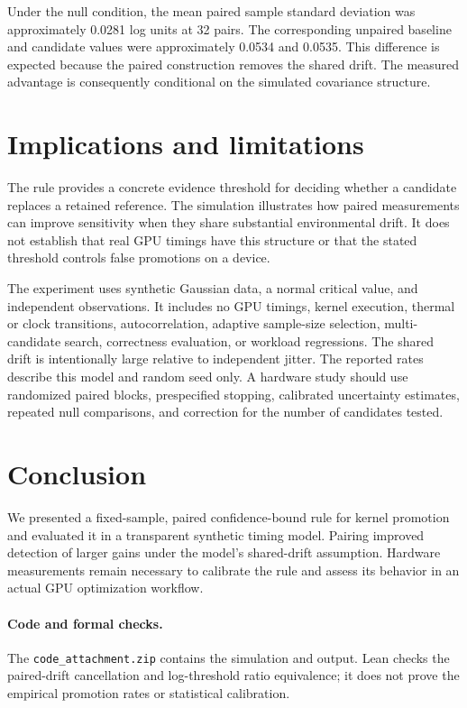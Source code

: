 \documentclass[11pt]{article}
\begin{document}
Under the null condition, the mean paired sample standard deviation was approximately 0.0281 log units at 32 pairs. The corresponding unpaired baseline and candidate values were approximately 0.0534 and 0.0535. This difference is expected because the paired construction removes the shared drift. The measured advantage is consequently conditional on the simulated covariance structure.

\section{Implications and limitations}
The rule provides a concrete evidence threshold for deciding whether a candidate replaces a retained reference. The simulation illustrates how paired measurements can improve sensitivity when they share substantial environmental drift. It does not establish that real GPU timings have this structure or that the stated threshold controls false promotions on a device.

The experiment uses synthetic Gaussian data, a normal critical value, and independent observations. It includes no GPU timings, kernel execution, thermal or clock transitions, autocorrelation, adaptive sample-size selection, multi-candidate search, correctness evaluation, or workload regressions. The shared drift is intentionally large relative to independent jitter. The reported rates describe this model and random seed only. A hardware study should use randomized paired blocks, prespecified stopping, calibrated uncertainty estimates, repeated null comparisons, and correction for the number of candidates tested.

\section{Conclusion}
We presented a fixed-sample, paired confidence-bound rule for kernel promotion and evaluated it in a transparent synthetic timing model. Pairing improved detection of larger gains under the model's shared-drift assumption. Hardware measurements remain necessary to calibrate the rule and assess its behavior in an actual GPU optimization workflow.

\paragraph{Code and formal checks.} The \texttt{code\_attachment.zip} contains the simulation and output. Lean checks the paired-drift cancellation and log-threshold ratio equivalence; it does not prove the empirical promotion rates or statistical calibration.


\end{document}
